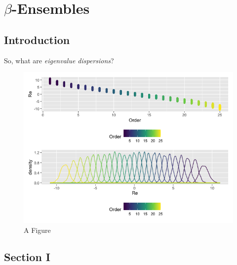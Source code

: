 
\chapter{$\beta$-Ensembles}

\section{Introduction}
So, what are \textit{eigenvalue dispersions}? 

\begin{figure}[h]
	   
	       \centering
	    \includegraphics[scale = 0.6]{chapters/graphics/c2_order_sign}
	     \caption{A Figure}
	 \label{subd}
	\end{figure}



\section{Section I}


